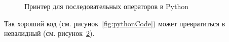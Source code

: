 \begin{figure}[h!]
	\inputminted{haskell}{codes/pythonPrinter.hs}
	\caption{Принтер для последовательных операторов в Python}
	\label{fig:pythonPrinter}
\end{figure}

Так хороший код (см. рисунок~\ref{fig:pythonCode}) может превратиться в невалидный (см. рисунок~\ref{fig:pythonCodeBad}).
\begin{figure}[h!]
	\begin{minipage}[b]{0.45\linewidth}
		\inputminted{python}{codes/pythonCode.py}
		\caption{}
		\label{fig:pythonCode}
	\end{minipage}
	\hspace{0.5cm}
	\begin{minipage}[b]{0.45\linewidth}
		\inputminted{python}{codes/pythonCodeBad.py}
		\caption{}
		\label{fig:pythonCodeBad}
	\end{minipage}
\end{figure}